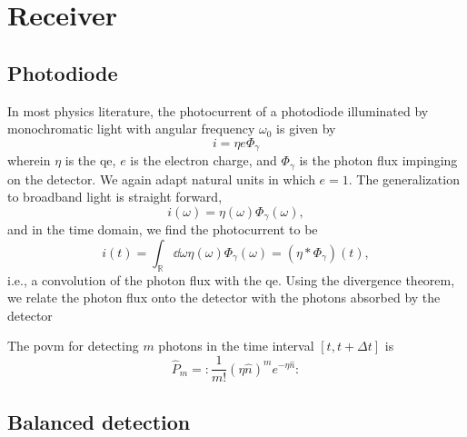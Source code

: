 \section{Receiver}

\subsection{Photodiode}

In most physics literature, the photocurrent of a photodiode illuminated by monochromatic light with angular frequency $\omega_0$ is given by~\cite[p.~650]{Saleh2007}
\begin{equation}
	i
	=
	\eta
	e
	\Phi_\gamma
\end{equation}
wherein $\eta$ is the \gls{qe}, $e$ is the electron charge, and $\Phi_\gamma$ is the photon flux impinging on the detector.
We again adapt natural units in which $e=1$.
The generalization to broadband light is straight forward,
\begin{equation}
	i(\omega)
	=
	\eta(\omega)
	\Phi_\gamma(\omega)
	,
\end{equation}
and in the time domain, we find the photocurrent to be
\begin{equation}
	i(t)
	=
	\int_\mathbb{R}\dd{\omega}
	\eta(\omega)
	\Phi_\gamma(\omega)
	=
	\left(\eta*\Phi_\gamma\right)(t)
	,
\end{equation}
i.e., a convolution of the photon flux with the \gls{qe}.
Using the divergence theorem, we relate the photon flux onto the detector with the photons absorbed by the detector

The \gls{povm} for detecting $m$ photons in the time interval $[t,t+\Delta t]$ is~\cite[p.~192]{Vogel2006}
\begin{equation}
	\hat{P}_m
	=
	\colon
	\frac{1}{m!}
	\left(\eta\hat{n}\right)^m
	e^{-\eta\hat{n}}
	\colon
\end{equation}



\subsection{Balanced detection}

